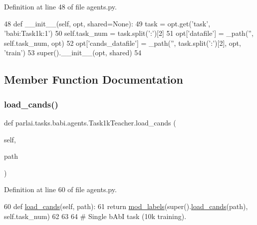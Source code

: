 Definition at line 48 of file agents.\+py.


\begin{DoxyCode}
48     \textcolor{keyword}{def }\_\_init\_\_(self, opt, shared=None):
49         task = opt.get(\textcolor{stringliteral}{'task'}, \textcolor{stringliteral}{'babi:Task1k:1'})
50         self.task\_num = task.split(\textcolor{stringliteral}{':'})[2]
51         opt[\textcolor{stringliteral}{'datafile'}] = \_path(\textcolor{stringliteral}{''}, self.task\_num, opt)
52         opt[\textcolor{stringliteral}{'cands\_datafile'}] = \_path(\textcolor{stringliteral}{''}, task.split(\textcolor{stringliteral}{':'})[2], opt, \textcolor{stringliteral}{'train'})
53         super().\_\_init\_\_(opt, shared)
54 
\end{DoxyCode}


\subsection{Member Function Documentation}
\mbox{\label{classparlai_1_1tasks_1_1babi_1_1agents_1_1Task1kTeacher_a23edda520c74d1b34de50e3c8994c2f1}} 
\subsubsection{\texorpdfstring{load\+\_\+cands()}{load\_cands()}}
{\footnotesize\ttfamily def parlai.\+tasks.\+babi.\+agents.\+Task1k\+Teacher.\+load\+\_\+cands (\begin{DoxyParamCaption}\item[{}]{self,  }\item[{}]{path }\end{DoxyParamCaption})}



Definition at line 60 of file agents.\+py.


\begin{DoxyCode}
60     \textcolor{keyword}{def }\hyperlink{namespaceparlai_1_1utils_1_1misc_ad935ab0a9d49b897c5e3efdbe1c46c4d}{load\_cands}(self, path):
61         \textcolor{keywordflow}{return} \hyperlink{namespaceparlai_1_1tasks_1_1babi_1_1agents_a80ee701751bc608fcb01bcfb1e884de0}{mod\_labels}(super().\hyperlink{namespaceparlai_1_1utils_1_1misc_ad935ab0a9d49b897c5e3efdbe1c46c4d}{load\_cands}(path), self.task\_num)
62 
63 
64 \textcolor{comment}{# Single bAbI task (10k training).}
\end{DoxyCode}
\mbox{\label{classparlai_1_1tasks_1_1babi_1_1agents_1_1Task1kTeacher_a191f80b829fd3103238317eed2cad03e}} 
